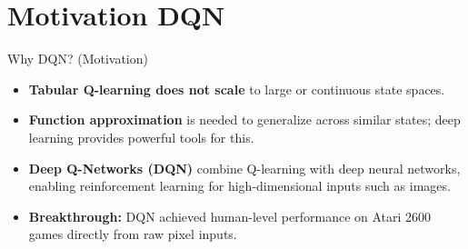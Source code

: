 \section{Motivation DQN}
\begin{frame}[allowframebreaks]{Why DQN? (Motivation)}
    \begin{itemize}
        \item \textbf{Tabular Q-learning does not scale} to large or continuous state spaces.
        \item \textbf{Function approximation} is needed to generalize across similar states; deep learning provides powerful tools for this.
        \item \textbf{Deep Q-Networks (DQN)} combine Q-learning with deep neural networks, enabling reinforcement learning for high-dimensional inputs such as images.
        \item \textbf{Breakthrough:} DQN achieved human-level performance on Atari 2600 games directly from raw pixel inputs.
    \end{itemize}
\end{frame}
